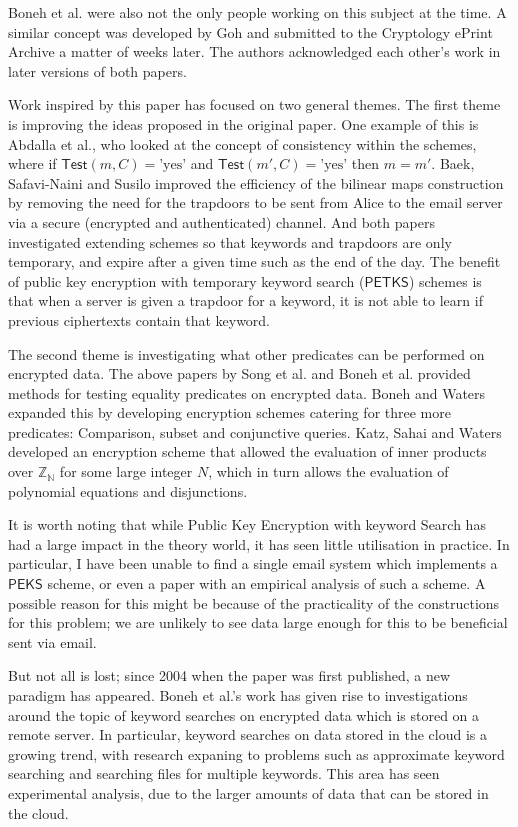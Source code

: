 \documentclass[a4paper,11pt]{article}
\begin{document}
    Boneh et al. were also not the only people working on this subject at the time. A similar concept was developed by Goh\cite{cryptoeprint:2003:216} and submitted to the Cryptology ePrint Archive a matter of weeks later. The authors acknowledged each other's work in later versions of both papers.

    Work inspired by this paper has focused on two general themes. The first theme is improving the ideas proposed in the original paper. One example of this is Abdalla et al.\cite{abdalla:se-revisited}, who looked at the concept of consistency within the schemes, where if $\mathsf{Test}(m, C) = \text{'yes'}$ and $\mathsf{Test}(m', C) = \text{'yes'}$ then $m = m'$. Baek, Safavi-Naini and Susilo\cite{baek:se-revisited} improved the efficiency of the bilinear maps construction by removing the need for the trapdoors to be sent from Alice to the email server via a secure (encrypted and authenticated) channel. And both papers investigated extending schemes so that keywords and trapdoors are only temporary, and expire after a given time such as the end of the day. The benefit of public key encryption with temporary keyword search ($\mathsf{PETKS}$) schemes is that when a server is given a trapdoor for a keyword, it is not able to learn if previous ciphertexts contain that keyword.

    The second theme is investigating what other predicates can be performed on encrypted data. The above papers by Song et al. and Boneh et al. provided methods for testing equality predicates on encrypted data. Boneh and Waters\cite{boneh:predicate} expanded this by developing encryption schemes catering for three more predicates: Comparison, subset and conjunctive queries. Katz, Sahai and Waters\cite{katz:predicate} developed an encryption scheme that allowed the evaluation of inner products over $\mathbb{Z_N}$ for some large integer $N$, which in turn allows the evaluation of polynomial equations and disjunctions.

    It is worth noting that while Public Key Encryption with keyword Search has had a large impact in the theory world, it has seen little utilisation in practice. In particular, I have been unable to find a single email system which implements a $\mathsf{PEKS}$ scheme, or even a paper with an empirical analysis of such a scheme. A possible reason for this might be because of the practicality of the constructions for this problem; we are unlikely to see data large enough for this to be beneficial sent via email.

    But not all is lost; since 2004 when the paper was first published, a new paradigm has appeared. Boneh et al.'s work has given rise to investigations around the topic of keyword searches on encrypted data which is stored on a remote server\cite{chang:remote}. In particular, keyword searches on data stored in the cloud is a growing trend, with research expaning to problems such as approximate keyword searching\cite{5462196} and searching files for multiple keywords\cite{6674958}. This area has seen experimental analysis, due to the larger amounts of data that can be stored in the cloud.
\end{document}
